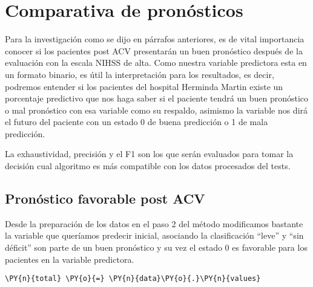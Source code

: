     \hypertarget{comparativa-de-pronuxf3sticos}{%
\section{Comparativa de
pronósticos}\label{comparativa-de-pronuxf3sticos}}

Para la investigación como se dijo en párrafos anteriores, es de vital
importancia conocer si los pacientes post ACV presentarán un buen
pronóstico después de la evaluación con la escala NIHSS de alta. Como
nuestra variable predictora esta en un formato binario, es útil la
interpretación para los resultados, es decir, podremos entender si los
pacientes del hospital Herminda Martin existe un porcentaje predictivo
que nos haga saber si el paciente tendrá un buen pronóstico o mal
pronóstico con esa variable como su respaldo, asimismo la variable nos
dirá el futuro del paciente con un estado 0 de buena predicción o 1 de
mala predicción.

La exhaustividad, precisión y el F1 son los que serán evaluados para
tomar la decisión cual algoritmo es más compatible con los datos
procesados del tests.

    \hypertarget{pronuxf3stico-favorable-post-acv}{%
\subsection{Pronóstico favorable post
ACV}\label{pronuxf3stico-favorable-post-acv}}

Desde la preparación de los datos en el paso 2 del método modificamos
bastante la variable que queríamos predecir inicial, asociando la
clasificación ``leve'' y ``sin déficit'' son parte de un buen pronóstico
y su vez el estado 0 es favorable para los pacientes en la variable
predictora.

    \begin{tcolorbox}[breakable, size=fbox, boxrule=1pt, pad at break*=1mm,colback=cellbackground, colframe=cellborder]
\begin{Verbatim}[commandchars=\\\{\}]
\PY{n}{total} \PY{o}{=} \PY{n}{data}\PY{o}{.}\PY{n}{values}
\end{Verbatim}
\end{tcolorbox}

